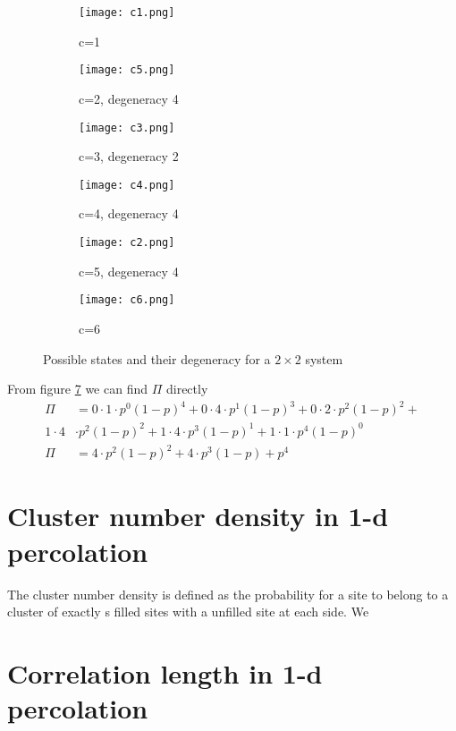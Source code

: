 \documentclass[a4paper,english, 10pt, twoside]{article}
\begin{document}
\begin{figure}[H]
\centering
  \begin{subfigure}[b]{0.3\textwidth}
    \texttt{[image: c1.png]}
    \caption{c=1}
    \label{L2:c1}
  \end{subfigure}
  \begin{subfigure}[b]{0.3\textwidth}
    \texttt{[image: c5.png]}
    \caption{c=2, degeneracy 4}
    \label{L2:c2}
  \end{subfigure}
  \begin{subfigure}[b]{0.3\textwidth}
    \texttt{[image: c3.png]}
    \caption{c=3, degeneracy 2}
    \label{L2:c3}
  \end{subfigure}
  
  \begin{subfigure}[b]{0.3\textwidth}
   \texttt{[image: c4.png]}
   \caption{c=4, degeneracy 4}
   \label{L2:c4}
  \end{subfigure}
  \begin{subfigure}[b]{0.3\textwidth}
   \texttt{[image: c2.png]}
   \caption{c=5, degeneracy 4}
   \label{L2:c5}
  \end{subfigure}
    \begin{subfigure}[b]{0.3\textwidth}
    \texttt{[image: c6.png]}
    \caption{c=6}
    \label{L2:c6}
  \end{subfigure}
  \caption{Possible states and their degeneracy for a $2\times2$ system}
  \label{L2}
\end{figure}
From figure \ref{L2} we can find $\Pi$ directly
\begin{align*}
 \Pi &= 0\cdot1\cdot p^0(1-p)^4 + 0\cdot4\cdot p^1(1-p)^3 + 0\cdot2\cdot p^2(1-p)^2 +\\
 1\cdot4&\cdot p^2(1-p)^2 + 1\cdot4\cdot p^3(1-p)^1 + 1\cdot1\cdot p^4(1-p)^0 \\
 \Pi &=4\cdot p^2(1-p)^2 + 4\cdot p^3(1-p) + p^4
\end{align*}

\section{Cluster number density in 1-d percolation}
The cluster number density is defined as the probability for a site to belong to a cluster of exactly s filled 
sites with a unfilled site at each side. We 

\section{Correlation length in 1-d percolation}
\end{document}
